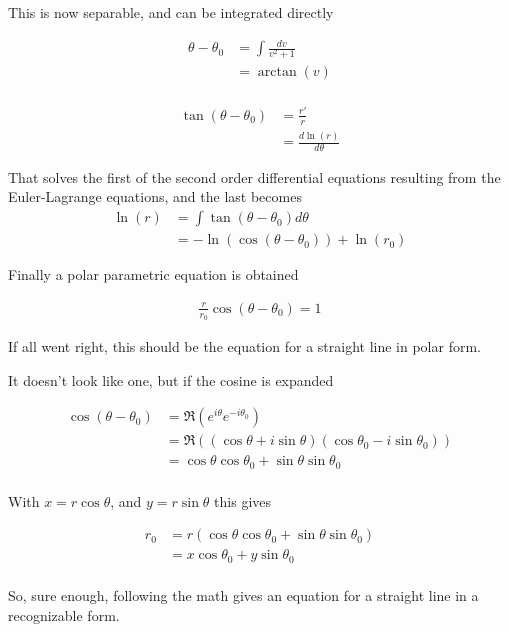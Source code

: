 \documentclass{article}
\begin{document}
This is now separable, and can be integrated directly

\begin{align*}
\theta - \theta_0
&= \int \frac{dv}{v^2 + 1} \\
&= \arctan(v) \\
\end{align*}
 
\begin{align*}
\tan(\theta - \theta_0)
&= \frac{{r'}}{r} \\
&= \frac{d \ln(r) }{d\theta}
\end{align*}

That solves the first of the second order differential equations resulting from the Euler-Lagrange equations, and the 
last becomes
\begin{align*}
\ln(r) &= \int \tan(\theta - \theta_0) d\theta \\
&= -\ln(\cos(\theta - \theta_0)) + \ln(r_0)
\end{align*}

Finally a polar parametric equation is obtained
 
\begin{align*}
\frac{r}{r_0} \cos(\theta - \theta_0) = 1
\end{align*}
 
If all went right, this should be the equation for a straight line in polar form.

It doesn't look like one, but if the cosine is expanded 

\begin{align*}
\cos(\theta - \theta_0) 
&= \Re\left( e^{i\theta}e^{-i\theta_0} \right) \\
&= \Re\left( (\cos\theta + i\sin\theta)(\cos\theta_0 - i\sin\theta_0) \right) \\
&= \cos\theta\cos\theta_0 + \sin\theta\sin\theta_0 \\
\end{align*}

With $x = r\cos\theta$, and $y = r\sin\theta$ this gives

\begin{align*}
r_0 
&= r \left( \cos\theta\cos\theta_0 + \sin\theta\sin\theta_0 \right) \\
&= x \cos\theta_0 + y\sin\theta_0 \\
\end{align*}

So, sure enough, following the math gives an equation for a straight line in a recognizable form.
\end{document}
